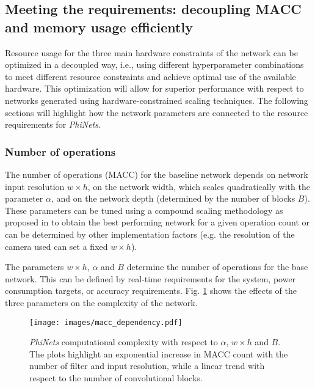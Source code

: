 \subsection{Meeting the requirements: decoupling MACC and memory usage efficiently}
\label{scaling}
Resource usage for the three main hardware constraints of the network can be optimized in a decoupled way, i.e., using different hyperparameter combinations to meet different resource constraints and achieve optimal use of the available hardware. This optimization will allow for superior performance with respect to networks generated using hardware-constrained scaling techniques. The following sections will highlight how the network parameters are connected to the resource requirements for \textit{PhiNets}.

\subsubsection{Number of operations}
The number of operations (MACC) for the baseline network depends on network input resolution $w\times h$, on the network width, which scales quadratically with the parameter $\alpha$, and on the network depth (determined by the number of blocks $B$). These parameters can be tuned using a compound scaling methodology as proposed in \cite{tan2021efficientnetv2} to obtain the best performing network for a given operation count or can be determined by other implementation factors (e.g. the resolution of the camera used can set a fixed $w\times h$).

The parameters $w\times h$, $\alpha$ and $B$ determine the number of operations for the base network. This can be defined by real-time requirements for the system, power consumption targets, or accuracy requirements. Fig. \ref{fig:macc_dependency} shows the effects of the three parameters on the complexity of the network.

\begin{figure}[H]
  \centering
  \texttt{[image: images/macc\_dependency.pdf]}
  \caption{\textit{PhiNets} computational complexity with respect to $\alpha$, $w\times h$ and $B$. The plots highlight an exponential increase in MACC count with the number of filter and input resolution, while a linear trend with respect to the number of convolutional blocks.}
  \label{fig:macc_dependency}
\end{figure}



